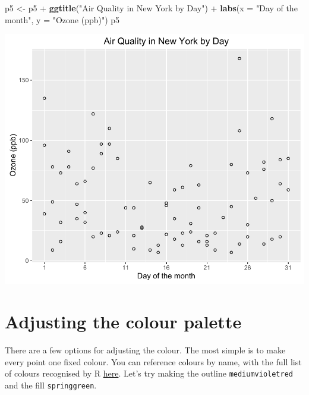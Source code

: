 \documentclass[]{article}
\newenvironment{Shaded}{\begin{snugshade}}{\end{snugshade}}
\newcommand{\KeywordTok}[1]{\textcolor[rgb]{0.13,0.29,0.53}{\textbf{{#1}}}}
\newcommand{\DataTypeTok}[1]{\textcolor[rgb]{0.13,0.29,0.53}{{#1}}}
\newcommand{\StringTok}[1]{\textcolor[rgb]{0.31,0.60,0.02}{{#1}}}
\newcommand{\NormalTok}[1]{{#1}}
\begin{document}
\begin{Shaded}
\begin{Highlighting}[]
\NormalTok{p5 <-}\StringTok{ }\NormalTok{p5 +}\StringTok{ }\KeywordTok{ggtitle}\NormalTok{(}\StringTok{"Air Quality in New York by Day"}\NormalTok{) +}\StringTok{ }
\StringTok{  }\KeywordTok{labs}\NormalTok{(}\DataTypeTok{x =} \StringTok{"Day of the month"}\NormalTok{, }\DataTypeTok{y =} \StringTok{"Ozone (ppb)"}\NormalTok{) }
\NormalTok{p5}
\end{Highlighting}
\end{Shaded}

\begin{center}\includegraphics{5_Scatter_Plots_pdf/scatter_4-1} \end{center}

\section{Adjusting the colour
palette}\label{adjusting-the-colour-palette}

There are a few options for adjusting the colour. The most simple is to
make every point one fixed colour. You can reference colours by name,
with the full list of colours recognised by R
\href{http://www.stat.columbia.edu/~tzheng/files/Rcolor.pdf}{here}.
Let's try making the outline \texttt{mediumvioletred} and the fill
\texttt{springgreen}.
\end{document}
